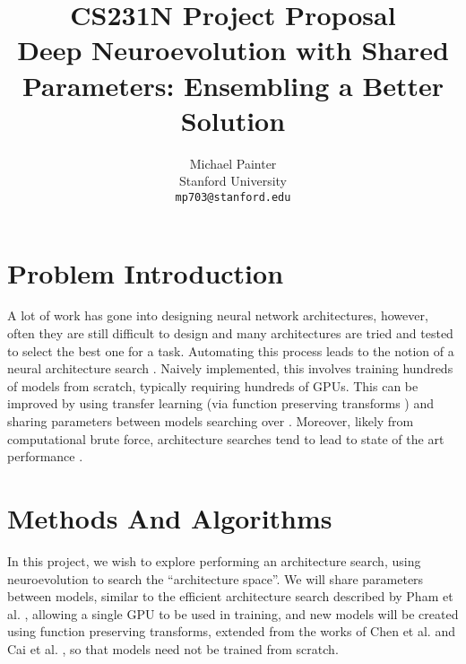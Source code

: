 \documentclass[10pt,letterpaper]{article}
\begin{document}
\title{CS231N Project Proposal \\ Deep Neuroevolution with Shared Parameters: Ensembling a Better Solution}

\author{Michael Painter\\
Stanford University\\
{\tt\small mp703@stanford.edu}
}

\maketitle

\newcommand{\cH}{\mathcal{H}}
\newcommand{\cX}{\mathcal{X}}
\newcommand{\cY}{\mathcal{Y}}

\section{Problem Introduction}
A lot of work has gone into designing neural network architectures, however, often they are still difficult to design and many architectures are tried and tested to select the best one for a task. Automating this process leads to the notion of a neural architecture search \cite{as2, as1, as3}. Naively implemented, this involves training hundreds of models from scratch, typically requiring hundreds of GPUs. This can be improved by using transfer learning (via function preserving transforms \cite{eas1, net2net}) and sharing parameters between models searching over \cite{eas2}. Moreover, likely from computational brute force, architecture searches tend to lead to state of the art performance \cite{as1}.

\section{Methods And Algorithms}

In this project, we wish to explore performing an architecture search, using neuroevolution to search the ``architecture space''. We will share parameters between models, similar to the efficient architecture search described by Pham et al. \cite{eas2}, allowing a single GPU to be used in training, and new models will be created using function preserving transforms, extended from the works of Chen et al. \cite{net2net} and Cai et al. \cite{eas1}, so that models need not be trained from scratch. 
\end{document}

